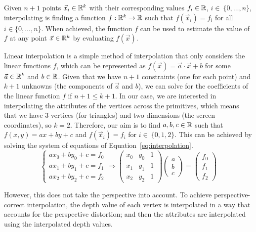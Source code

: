 Given $n+1$ points $\vec{x}_i\in \mathbb{R}^k$ with their corresponding values $f_i\in \mathbb{R}$, $i\in~\{0, \ldots, n\}$, interpolating is finding a function $f:\mathbb{R}^k\to \mathbb{R}$ such that $f(\vec{x}_i) = f_i$ for all $i\in \{0, \ldots, n\}$. When achieved, the function $f$ can be used to estimate the value of $f$ at any point $\vec{x}\in \mathbb{R}^k$ by evaluating $f(\vec{x})$.

Linear interpolation is a simple method of interpolation that only considers the linear functions $f$, which can be represented as $f(\vec{x}) = \vec{a}\cdot \vec{x} + b$ for some $\vec{a}\in \mathbb{R}^k$ and $b\in \mathbb{R}$. Given that we have $n+1$ constraints (one for each point) and $k+1$ unknowns (the components of $\vec{a}$ and $b$), we can solve for the coefficients of the linear function $f$ if $n+1 \leq k+1$. In our case, we are interested in interpolating the attributes of the vertices across the primitives, which means that we have $3$ vertices (for triangles) and two dimensions (the screen coordinates), so $k=2$. Therefore, our aim is to find $a,b,c\in \mathbb{R}$ such that $f(x,y) = ax + by + c$ and $f(\vec{x}_i) = f_i$ for $i\in~\{0, 1, 2\}$. This can be achieved by solving the system of equations of Equation~\eqref{eq:interpolation}.
\begin{equation}
    \begin{cases}
        ax_0 + by_0 + c = f_0\\
        ax_1 + by_1 + c = f_1\\
        ax_2 + by_2 + c = f_2
    \end{cases}
    \Longrightarrow
    \begin{pmatrix}
        x_0 & y_0 & 1\\
        x_1 & y_1 & 1\\
        x_2 & y_2 & 1
    \end{pmatrix}
    \begin{pmatrix}
        a\\
        b\\
        c
    \end{pmatrix}
    =
    \begin{pmatrix}
        f_0\\
        f_1\\
        f_2
    \end{pmatrix}
    \label{eq:interpolation}
\end{equation}

However, this does not take the perspective into account. To achieve perspective-correct interpolation, the depth value of each vertex is interpolated in a way that accounts for the perspective distortion; and then the attributes are interpolated using the interpolated depth values.

